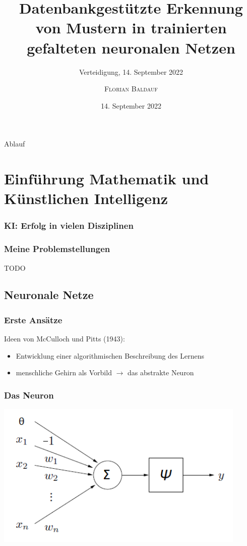 \documentclass[10pt]{beamer} %
\title[Datenbankgestützte Erkennung von Mustern in trainierten gefalteten neuronalen Netzen]{Datenbankgestützte Erkennung von Mustern in trainierten gefalteten neuronalen Netzen}
\subtitle{Verteidigung, 14. September 2022}
\author{\textsc{Florian Baldauf}}
\date{14. September 2022}
\institute{Universität Rostock, Institut für Mathematik}
\begin{document}
\begin{frame}%
  \titlepage
\end{frame}


\begin{frame}{Ablauf}%
  \tableofcontents[pausesections]
\end{frame}


\section{Einführung Mathematik und Künstlichen Intelligenz}


\begin{frame}
   \frametitle[]{KI: Erfolg in vielen Disziplinen}
\end{frame}

\begin{frame}
   \frametitle[]{Meine Problemstellungen}
   TODO
\end{frame}
\subsection{Neuronale Netze}

\begin{frame}
  \frametitle{Erste Ansätze}
Ideen von McCulloch und Pitts (1943):
\begin{itemize}
   \item Entwicklung einer algorithmischen Beschreibung des Lernens
   \item menschliche Gehirn als Vorbild $\rightarrow$ das abstrakte Neuron
\end{itemize}
\end{frame}

\begin{frame}
   \frametitle[]{Das Neuron}
   \includegraphics[width=0.9\textwidth]{pics/perzeptron.png}
\end{frame}
\end{document}
